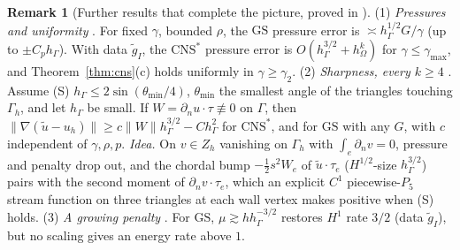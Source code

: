 \documentclass[5p,times]{elsarticle}
\theoremstyle{definition}
\newtheorem{remark}{Remark}
\newcommand{\hG}{h_\Gamma}
\newcommand{\hO}{h_\Omega}
\newcommand{\Gh}{\Gamma_h}
\newcommand{\Zh}{Z_h}
\newcommand{\dn}{\partial_n}
\newcommand{\ut}{\tilde u}
\newcommand{\norm}[1]{\lVert #1\rVert}
\newcommand{\GS}{\mathrm{GS}}
\newcommand{\CNS}{\mathrm{CNS}^\ast}
\newcommand{\ext}[1]{\cite[#1]{PadhiExt}}
\begin{document}
\begin{remark}[Further results that complete the picture, proved in \cite{PadhiExt}]\label{rem:further}
(1) \emph{Pressures and uniformity} \ext{Thms.~8.11, 8.7, 7.30, 7.33}. For fixed $\gamma$, bounded $\rho$, the $\GS$ pressure error is $\asymp\hG^{1/2}G/\gamma$ (up to $\pm C_p\hG$). With data $\tilde g_I$, the $\CNS$ pressure error is $O(\hG^{3/2}+\hO^k)$ for $\gamma\le\gamma_{\max}$, and Theorem~\ref{thm:cns}(c) holds uniformly in $\gamma\ge\gamma_2$.
(2) \emph{Sharpness, every $k\ge4$} \ext{Thms.~7.8, 7.24}. Assume (S) $\hG\le2\sin(\theta_{\min}/4)$, $\theta_{\min}$ the smallest angle of the triangles touching $\Gh$, and let $\hG$ be small. If $W=\dn u\cdot\tau\not\equiv0$ on $\Gamma$, then $\norm{\nabla(\ut-u_h)}\ge c\norm W\hG^{3/2}-C\hG^2$ for $\CNS$, and for $\GS$ with any $G$, with $c$ independent of $\gamma,\rho,p$. \emph{Idea.} On $v\in\Zh$ vanishing on $\Gh$ with $\int_e\dn v=0$, pressure and penalty drop out, and the chordal bump $-\frac12s^2W_e$ of $\ut\cdot\tau_e$ ($H^{1/2}$-size $\hG^{3/2}$) pairs with the second moment of $\dn v\cdot\tau_e$, which an explicit $C^1$ piecewise-$P_5$ stream function on three triangles at each wall vertex makes positive when (S) holds.
(3) \emph{A growing penalty} \ext{Thm.~7.30, Cor.~7.34, Thm.~7.35}. For $\GS$, $\mu\gtrsim h\hG^{-3/2}$ restores $H^1$ rate $3/2$ (data $\tilde g_I$), but no scaling gives an energy rate above $1$.
\end{remark}
\end{document}
